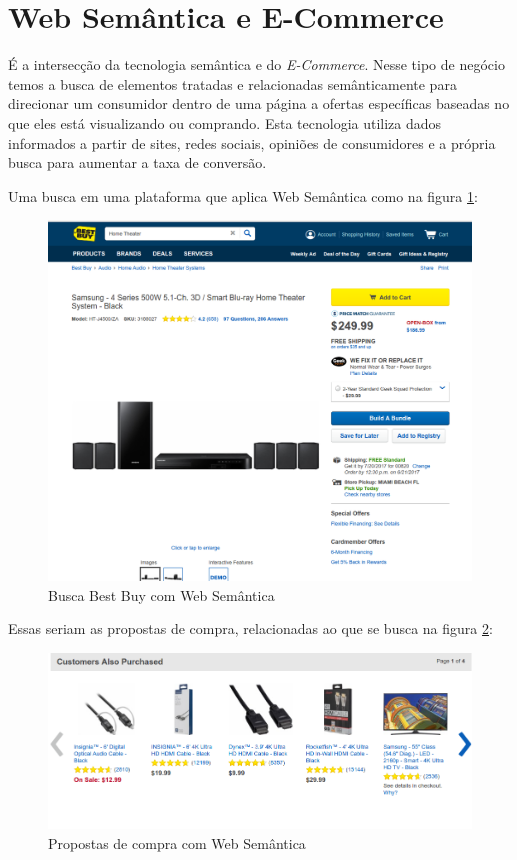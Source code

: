 \section{Web Semântica e E-Commerce}

É a intersecção da tecnologia semântica e do \textit{E-Commerce}. Nesse tipo de negócio temos a busca de elementos tratadas e relacionadas semânticamente para direcionar um consumidor dentro de uma página a ofertas específicas baseadas no que eles está visualizando ou comprando. Esta tecnologia utiliza dados informados a partir de sites, redes sociais, opiniões de consumidores e a própria busca para aumentar a taxa de conversão.

Uma busca em uma plataforma que aplica Web Semântica como na figura \ref{fig03}:

\begin{figure}[h]
	\centering
	\includegraphics[keepaspectratio=true,scale=0.3]{figuras/HomeBusca.png}
	\caption{Busca Best Buy com Web Semântica}
	\label{fig03}
\end{figure}

Essas seriam as propostas de compra, relacionadas ao que se busca na figura \ref{fig04}:

\begin{figure}[h]
	\centering
	\includegraphics[keepaspectratio=true,scale=0.3]{figuras/HomeResultado.png}
	\caption{Propostas de compra com Web Semântica}
	\label{fig04}
\end{figure}


